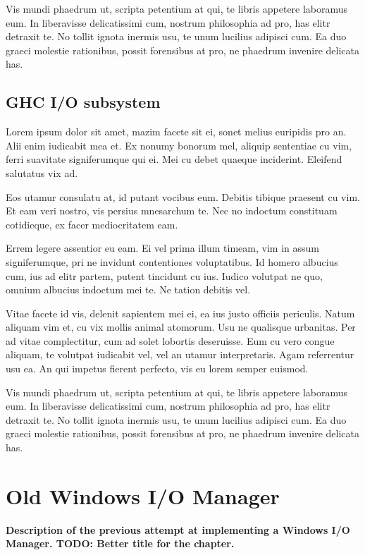 \documentclass[a4paper,11pt,oneside]{report}
\begin{document}
Vis mundi phaedrum ut, scripta petentium at qui, te libris appetere laboramus
eum. In liberavisse delicatissimi cum, nostrum philosophia ad pro, has elitr
detraxit te. No tollit ignota inermis usu, te unum lucilius adipisci cum. Ea duo
graeci molestie rationibus, possit forensibus at pro, ne phaedrum invenire
delicata has.

\section{GHC I/O subsystem}

Lorem ipsum dolor sit amet, mazim facete sit ei, sonet melius euripidis pro
an. Alii enim iudicabit mea et. Ex nonumy bonorum mel, aliquip sententiae cu
vim, ferri suavitate signiferumque qui ei. Mei cu debet quaeque
inciderint. Eleifend salutatus vix ad.

Eos utamur consulatu at, id putant vocibus eum. Debitis tibique praesent cu
vim. Et eam veri nostro, vis persius mnesarchum te. Nec no indoctum constituam
cotidieque, ex facer mediocritatem eam.

Errem legere assentior eu eam. Ei vel prima illum timeam, vim in assum
signiferumque, pri ne invidunt contentiones voluptatibus. Id homero albucius
cum, ius ad elitr partem, putent tincidunt cu ius. Iudico volutpat ne quo,
omnium albucius indoctum mei te. Ne tation debitis vel.

Vitae facete id vis, delenit sapientem mei ei, ea ius justo officiis
periculis. Natum aliquam vim et, cu vix mollis animal atomorum. Usu ne qualisque
urbanitas. Per ad vitae complectitur, cum ad solet lobortis deseruisse. Eum cu
vero congue aliquam, te volutpat iudicabit vel, vel an utamur
interpretaris. Agam referrentur usu ea. An qui impetus fierent perfecto, vis eu
lorem semper euismod.

Vis mundi phaedrum ut, scripta petentium at qui, te libris appetere laboramus
eum. In liberavisse delicatissimi cum, nostrum philosophia ad pro, has elitr
detraxit te. No tollit ignota inermis usu, te unum lucilius adipisci cum. Ea duo
graeci molestie rationibus, possit forensibus at pro, ne phaedrum invenire
delicata has.


\chapter{Old Windows I/O Manager}

\textbf{Description of the previous attempt at implementing a Windows I/O
  Manager. TODO: Better title for the chapter.}
\end{document}
